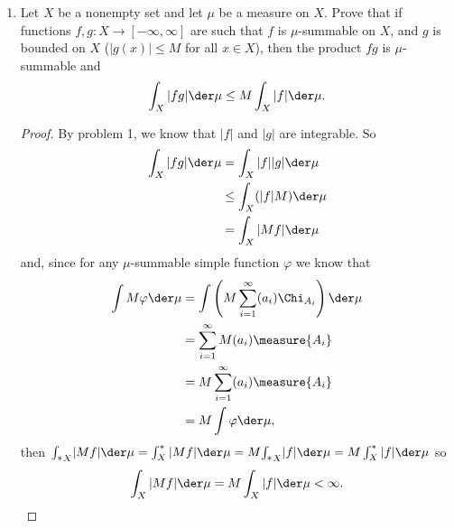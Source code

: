 \documentclass[12pt,letterpaper]{article}
\begin{document}
\begin{enumerate}
\item Let $X$ be a nonempty set and let $\mu$ be a measure on $X$. Prove that if \mumeasurable{} functions $f, g : X \to [−\infty,\infty]$ are such that $f$ is $\mu$-summable on $X$, and $g$ is bounded on $X$ ($|g(x)| \leq M$ for all $x \in X$), then the product $fg$ is $\mu$-summable and
$$\int_X |fg|\der\mu \leq M\int_X |f|\der\mu.$$
\begin{proof}
By problem 1, we know that $|f|$ and $|g|$ are integrable. So 
\begin{align*}
	\int_X |fg|\der\mu &= \int_X |f||g|\der\mu\\
	&\leq \int_X (|f|M)\der\mu\\
	&= \int_X |Mf|\der\mu\\
\end{align*}
and, since for any $\mu$-summable simple function $\varphi$ we know that 
	\begin{align*}
	\int M\varphi \der\mu&= \int \left(M\sum_{i=1}^\infty (a_i) \Chi_{A_i} \right)\der\mu \\
	&= \sum_{i=1}^\infty M(a_i) \measure{A_i}\\
	&= M\sum_{i=1}^\infty (a_i) \measure{A_i}\\
	&= M\int \varphi \der\mu,\\
	\end{align*}
then ${\int_*}_X |Mf| \der \mu = \int^*_X |Mf| \der \mu = M{\int_*}_X |f| \der \mu = M\int^*_X |f| \der \mu $ so 
$$\int_X |Mf|\der\mu = M\int_X |f|\der\mu < \infty.$$
\end{proof}


\end{enumerate}
\end{document}

